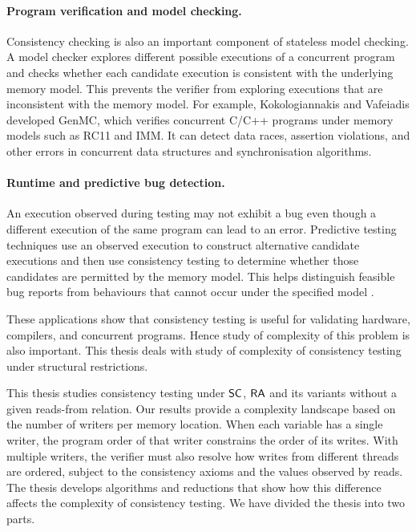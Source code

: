 \paragraph*{Program verification and model checking.} Consistency checking is also an important component of stateless model checking. A model checker explores different possible executions of a concurrent program and checks whether each candidate execution is consistent with the underlying memory model. This prevents the verifier from exploring executions that are inconsistent with the memory model. For example, Kokologiannakis and Vafeiadis \cite{GenMC-CAV-21} developed GenMC, which verifies concurrent C/C++ programs under memory models such as RC11 and IMM. It can detect data races, assertion violations, and other errors in concurrent data structures and synchronisation algorithms.


\paragraph*{Runtime and predictive bug detection.} An execution observed during testing may not exhibit a bug even though a different execution of the same program can lead to an error. Predictive testing techniques use an observed execution to construct alternative candidate executions and then use consistency  testing to determine whether those candidates are permitted by the memory model. This helps distinguish feasible bug reports from behaviours that cannot occur under the specified model \cite{Mathur20,10.1145/3276516,Huang14,10.1145/3371085,Liu25}.

These applications show that consistency testing is useful for validating hardware, compilers, and concurrent programs. Hence study of complexity of this problem is also important. This thesis deals with study of complexity of consistency testing under structural restrictions.  


This thesis studies consistency testing under $\mathsf{SC}$, $\mathsf{RA}$ and its variants without a given reads-from relation. Our results provide a complexity landscape based on the number of writers per memory location. When each variable has a single writer, the program order of that writer constrains the order of its writes. With multiple writers, the verifier must also resolve how writes from different threads are ordered, subject to the consistency axioms and the values observed by reads. The thesis develops algorithms and reductions that show how this difference affects the complexity of consistency testing. We have divided the thesis into two parts.

